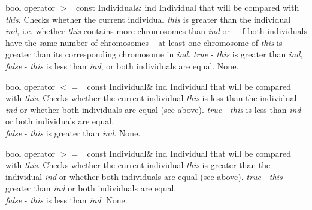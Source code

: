 \clearpage

\setConstInstance
\printMethodWithOneParam
{bool}
{operator $>$\ }
{const Individual\&}
{ind}
{Individual that will be compared with {\em this}.}
{Checks whether the current individual {\em this} is greater than
 the individual {\em ind}, i.e. whether {\em this}
 contains more chromosomes than {\em ind} or -- if both individuals
 have the same number of chromosomes -- at least one chromosome
 of {\em this} is greater than its corresponding chromosome
 in {\em ind}.}
{
 {\em true}  - {\em this} is greater than {\em ind},\\
 {\em false} - {\em this} is less than {\em ind}, or both individuals
 are equal.}
{None.}

\vspace*{4ex}

\setConstInstance
\printMethodWithOneParam
{bool}
{operator $<=$\ }
{const Individual\&}
{ind}
{Individual that will be compared with {\em this}.}
{Checks whether the current individual {\em this} is less than
 the individual {\em ind} or whether both individuals are equal (see
 above).}
{
 {\em true}  - {\em this} is less than {\em ind} or both individuals
 are equal,\\
 {\em false} - {\em this} is greater than {\em ind}.}
{None.}

\vspace*{4ex}

\setConstInstance
\printMethodWithOneParam
{bool}
{operator $>=$\ }
{const Individual\&}
{ind}
{Individual that will be compared with {\em this}.} 
{Checks whether the current individual {\em this} is greater than
 the individual {\em ind} or whether both individuals are equal (see
 above).}
{
 {\em true}  - {\em this} greater than {\em ind} or both individuals
 are equal,\\ 
 {\em false} - {\em this} is less than {\em ind}.}
{None.}

\clearpage


